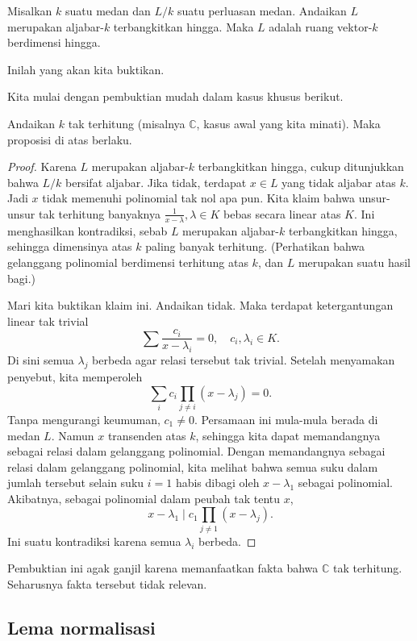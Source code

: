 \begin{proposition}
Misalkan $k$ suatu medan dan $L/k$ suatu perluasan medan. Andaikan $L$ merupakan aljabar-$k$
terbangkitkan hingga. Maka $L$ adalah ruang vektor-$k$ berdimensi hingga.
\end{proposition}
Inilah yang akan kita buktikan.

Kita mulai dengan pembuktian mudah dalam kasus khusus berikut.
\begin{lemma}
Andaikan $k$ tak terhitung (misalnya $\mathbb{C}$, kasus awal yang kita minati).
Maka proposisi di atas berlaku.
\end{lemma}
\begin{proof}
Karena $L$ merupakan aljabar-$k$ terbangkitkan hingga, cukup ditunjukkan bahwa $L/k$
bersifat aljabar.
Jika tidak, terdapat $x \in L$ yang tidak aljabar atas $k$. Jadi $x$ tidak memenuhi
polinomial tak nol apa pun.
Kita klaim bahwa unsur-unsur tak terhitung banyaknya $\frac{1}{x-\lambda}, \lambda
\in K$ bebas secara linear
atas $K$. Ini menghasilkan kontradiksi, sebab $L$ merupakan aljabar-$k$
terbangkitkan hingga, sehingga dimensinya atas $k$ paling banyak terhitung. (Perhatikan bahwa
gelanggang polinomial berdimensi terhitung atas $k$, dan $L$ merupakan suatu hasil bagi.)

Mari kita buktikan klaim ini. Andaikan tidak. Maka terdapat ketergantungan linear tak trivial
\[ \sum \frac{c_i}{x - \lambda_i}  = 0, \quad c_i, \lambda_i \in K. \]
Di sini semua $\lambda_j$ berbeda agar relasi tersebut tak trivial. Setelah menyamakan
penyebut, kita memperoleh
\[ \sum_i c_i \prod_{j \neq i } (x- \lambda_j) = 0. \]
Tanpa mengurangi keumuman, $c_1 \neq 0$.
Persamaan ini mula-mula berada di medan $L$. Namun $x$ transenden atas $k$, sehingga kita
dapat memandangnya sebagai relasi dalam gelanggang polinomial.
Dengan memandangnya sebagai relasi dalam gelanggang polinomial, kita melihat bahwa
semua suku dalam jumlah tersebut selain suku $i =1$ habis dibagi oleh $x - \lambda_1$
sebagai polinomial.
Akibatnya, sebagai polinomial dalam peubah tak tentu $x$,
\[ x - \lambda_1 \mid c_1 \prod_{j \neq 1} (x - \lambda_j).  \]
Ini suatu kontradiksi karena semua $\lambda_i$ berbeda.
\end{proof}

Pembuktian ini agak ganjil karena memanfaatkan fakta bahwa $\mathbb{C}$
tak terhitung.
Seharusnya fakta tersebut tidak relevan.

\subsection{Lema normalisasi}

